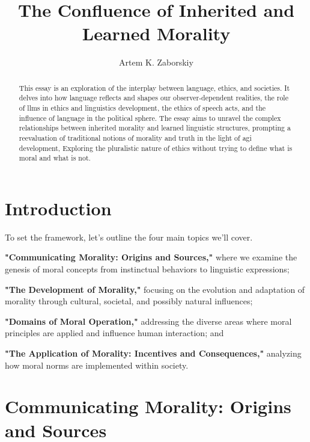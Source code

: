 \documentclass[12pt,a4]{article}
\begin{document}
\title{The Confluence of Inherited and Learned Morality}

\author{Artem K. Zaborskiy }


\maketitle

\begin{abstract}
This essay is an exploration of the interplay between language, ethics, and societies. It delves into how language reflects and shapes our observer-dependent realities, the role of \ac{llms} in ethics and linguistics development, the ethics of speech acts, and the influence of language in the political sphere. The essay aims to unravel the complex relationships between inherited morality and learned linguistic structures, prompting a reevaluation of traditional notions of morality and truth in the light of \ac{agi} development, Exploring the pluralistic nature of ethics without trying to define what is moral and what is not. 
\end{abstract}

\tableofcontents
\printacronyms



\section{Introduction}
To set the framework, let's outline the four main topics we'll cover.

\textbf{"Communicating Morality: Origins and Sources,"} where we examine the genesis of moral concepts from instinctual behaviors to linguistic expressions;

\textbf{"The Development of Morality,"} focusing on the evolution and adaptation of morality through cultural, societal, and possibly natural influences;

\textbf{"Domains of Moral Operation,"} addressing the diverse areas where moral principles are applied and influence human interaction; and

\textbf{"The Application of Morality: Incentives and Consequences,"} analyzing how moral norms are implemented within society.


\section{Communicating Morality: Origins and Sources}
\end{document}

